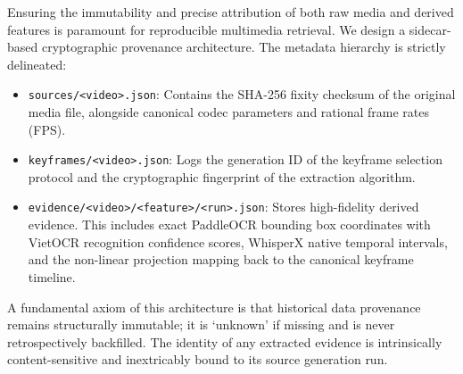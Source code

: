 Ensuring the immutability and precise attribution of both raw media and derived features is paramount for reproducible multimedia retrieval. We design a sidecar-based cryptographic provenance architecture. The metadata hierarchy is strictly delineated:
\begin{itemize}
    \item \texttt{sources/\textless video\textgreater.json}: Contains the SHA-256 fixity checksum of the original media file, alongside canonical codec parameters and rational frame rates (FPS).
    \item \texttt{keyframes/\textless video\textgreater.json}: Logs the generation ID of the keyframe selection protocol and the cryptographic fingerprint of the extraction algorithm.
    \item \texttt{evidence/\textless video\textgreater/\textless feature\textgreater/\textless run\textgreater.json}: Stores high-fidelity derived evidence. This includes exact PaddleOCR bounding box coordinates with VietOCR recognition confidence scores, WhisperX native temporal intervals, and the non-linear projection mapping back to the canonical keyframe timeline.
\end{itemize}
A fundamental axiom of this architecture is that historical data provenance remains structurally immutable; it is `unknown' if missing and is never retrospectively backfilled. The identity of any extracted evidence is intrinsically content-sensitive and inextricably bound to its source generation run.
